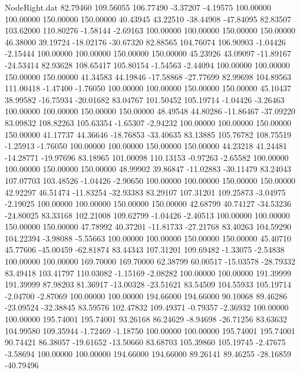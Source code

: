 \begin{filecontents}{NodeRight.dat}
  82.79460  109.56055  106.77490    -3.37207   -4.19575  100.00000  100.00000  150.00000  150.00000   40.43945   43.22510  -38.44908  -47.84095
  82.83507  103.62000  110.80276    -1.58144   -2.69163  100.00000  100.00000  150.00000  150.00000   46.38000   39.19724  -18.02176  -30.67320
  82.88565  104.76074  106.90903    -1.04426   -2.15444  100.00000  100.00000  150.00000  150.00000   45.23926   43.09097  -11.89167  -24.53414
  82.93628  108.65417  105.80154    -1.54563   -2.44094  100.00000  100.00000  150.00000  150.00000   41.34583   44.19846  -17.58868  -27.77699
  82.99698  104.89563  111.00418    -1.47400   -1.76050  100.00000  100.00000  150.00000  150.00000   45.10437   38.99582  -16.75934  -20.01682
  83.04767  101.50452  105.19714    -1.04426   -3.26463  100.00000  100.00000  150.00000  150.00000   48.49548   44.80286  -11.86467  -37.09220
  83.09832  108.82263  105.63354    -1.65307   -2.94232  100.00000  100.00000  150.00000  150.00000   41.17737   44.36646  -18.76853  -33.40635
  83.13885  105.76782  108.75519    -1.25913   -1.76050  100.00000  100.00000  150.00000  150.00000   44.23218   41.24481  -14.28771  -19.97696
  83.18965  101.00098  110.13153    -0.97263   -2.65582  100.00000  100.00000  150.00000  150.00000   48.99902   39.86847  -11.02883  -30.11479
  83.24043  107.07703  103.48526    -1.04426   -2.90650  100.00000  100.00000  150.00000  150.00000   42.92297   46.51474  -11.83254  -32.93383
  83.29107  107.31201  109.25873    -3.04975   -2.19025  100.00000  100.00000  150.00000  150.00000   42.68799   40.74127  -34.53236  -24.80025
  83.33168  102.21008  109.62799    -1.04426   -2.40513  100.00000  100.00000  150.00000  150.00000   47.78992   40.37201  -11.81733  -27.21768
  83.40263  104.59290  104.22394    -3.98088   -5.55663  100.00000  100.00000  150.00000  150.00000   45.40710   45.77606  -45.00459  -62.81874
  83.44343  107.31201  109.69482    -1.33075   -2.54838  100.00000  100.00000  169.70000  169.70000   62.38799   60.00517  -15.03578  -28.79332
  83.49418  103.41797  110.03082    -1.15169   -2.08282  100.00000  100.00000  191.39999  191.39999   87.98203   81.36917  -13.00328  -23.51621
  83.54509  104.55933  105.19714    -2.04700   -2.87069  100.00000  100.00000  194.66000  194.66000   90.10068   89.46286  -23.09524  -32.38845
  83.59576  102.47832  109.49371    -0.79357   -2.36932  100.00000  100.00000  195.74001  195.74001   93.26168   86.24629   -8.94698  -26.71256
  83.63632  104.99580  109.35944    -1.72469   -1.18750  100.00000  100.00000  195.74001  195.74001   90.74421   86.38057  -19.61652  -13.50660
  83.68703  105.39860  105.19745    -2.47675   -3.58694  100.00000  100.00000  194.66000  194.66000   89.26141   89.46255  -28.16859  -40.79496

\end{filecontents}
